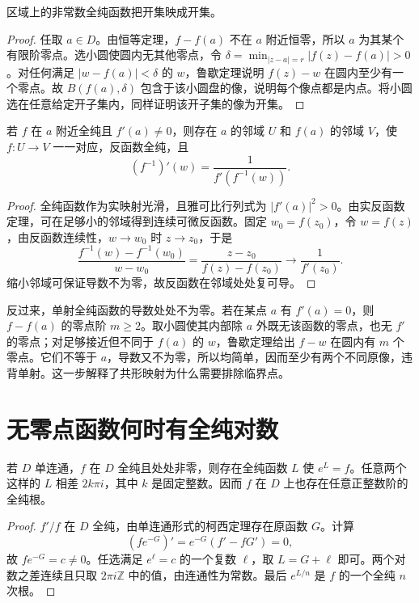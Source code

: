 \documentclass[UTF8,12pt,a4paper,fontset=fandol]{ctexbook}
\begin{document}
\begin{theorem}[开映射定理]
\label{thm:cv-open-map}
区域上的非常数全纯函数把开集映成开集。
\end{theorem}
\begin{proof}
任取 $a\in D$。由恒等定理，$f-f(a)$ 不在 $a$ 附近恒零，所以 $a$ 为其某个有限阶零点。选小圆使圆内无其他零点，令 $\delta=\min_{|z-a|=r}|f(z)-f(a)|>0$。对任何满足 $|w-f(a)|<\delta$ 的 $w$，鲁歇定理说明 $f(z)-w$ 在圆内至少有一个零点。故 $B(f(a),\delta)$ 包含于该小圆盘的像，说明每个像点都是内点。将小圆选在任意给定开子集内，同样证明该开子集的像为开集。
\end{proof}

\begin{theorem}[全纯反函数定理]
\label{thm:cv-inverse}
若 $f$ 在 $a$ 附近全纯且 $f'(a)\ne0$，则存在 $a$ 的邻域 $U$ 和 $f(a)$ 的邻域 $V$，使 $f:U\to V$ 一一对应，反函数全纯，且
\[
 (f^{-1})'(w)=\frac1{f'(f^{-1}(w))}.
\]
\end{theorem}
\begin{proof}
全纯函数作为实映射光滑，且雅可比行列式为 $|f'(a)|^2>0$。由实反函数定理，可在足够小的邻域得到连续可微反函数。固定 $w_0=f(z_0)$，令 $w=f(z)$，由反函数连续性，$w\to w_0$ 时 $z\to z_0$，于是
\[
 \frac{f^{-1}(w)-f^{-1}(w_0)}{w-w_0}
 =\frac{z-z_0}{f(z)-f(z_0)}\longrightarrow\frac1{f'(z_0)}.
\]
缩小邻域可保证导数不为零，故反函数在邻域处处复可导。
\end{proof}

反过来，单射全纯函数的导数处处不为零。若在某点 $a$ 有 $f'(a)=0$，则 $f-f(a)$ 的零点阶 $m\ge2$。取小圆使其内部除 $a$ 外既无该函数的零点，也无 $f'$ 的零点；对足够接近但不同于 $f(a)$ 的 $w$，鲁歇定理给出 $f-w$ 在圆内有 $m$ 个零点。它们不等于 $a$，导数又不为零，所以均简单，因而至少有两个不同原像，违背单射。这一步解释了共形映射为什么需要排除临界点。

\section{无零点函数何时有全纯对数}

\begin{theorem}[单连通区域上的全纯对数]
\label{thm:cv-holomorphic-log}
若 $D$ 单连通，$f$ 在 $D$ 全纯且处处非零，则存在全纯函数 $L$ 使 $e^L=f$。任意两个这样的 $L$ 相差 $2k\pi i$，其中 $k$ 是固定整数。因而 $f$ 在 $D$ 上也存在任意正整数阶的全纯根。
\end{theorem}
\begin{proof}
$f'/f$ 在 $D$ 全纯，由单连通形式的柯西定理存在原函数 $G$。计算
\[
 (fe^{-G})'=e^{-G}(f'-fG')=0,
\]
故 $fe^{-G}=c\ne0$。任选满足 $e^\ell=c$ 的一个复数 $\ell$，取 $L=G+\ell$ 即可。两个对数之差连续且只取 $2\pi i\mathbb Z$ 中的值，由连通性为常数。最后 $e^{L/n}$ 是 $f$ 的一个全纯 $n$ 次根。
\end{proof}
\end{document}
